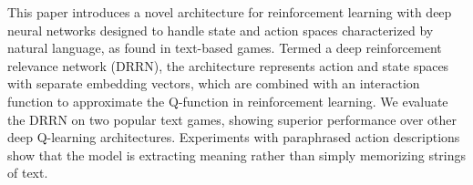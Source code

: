 This paper introduces a novel architecture for reinforcement learning with deep neural networks designed to handle state and action spaces characterized by natural language, as found in text-based games. Termed a deep reinforcement relevance network (DRRN), the architecture represents action and state spaces with separate embedding vectors, which are combined with an interaction function to approximate the Q-function in reinforcement learning. We evaluate the DRRN on two popular text games, showing superior performance over other deep Q-learning architectures. Experiments with paraphrased action descriptions show that the model is extracting meaning rather than simply memorizing strings of text.
